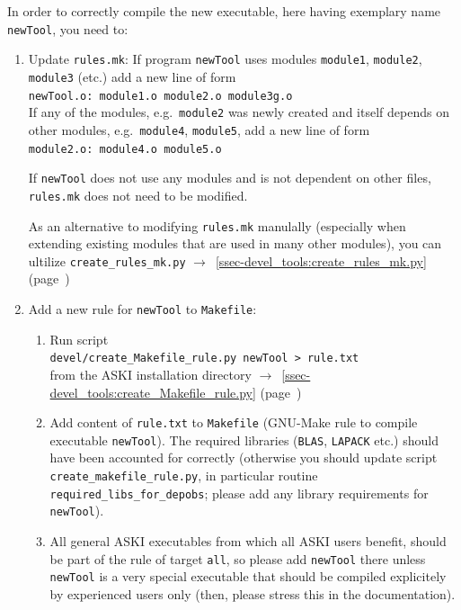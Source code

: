 \documentclass[12pt,a4paper]{article}
\newcommand{\lcode}[1]{\nolinkurl{#1}}
\newcommand{\ASKI}{ {\ttfamily ASKI} }
\newcommand{\myaref}[1]{$\rightarrow$~\ref{#1} (page~\pageref{#1})}
\begin{document}
In order to correctly compile the new executable, here having exemplary name \lcode{newTool}, you need to:
\begin{enumerate}
\item Update \lcode{rules.mk}:
  If program \lcode{newTool} uses modules \lcode{module1}, \lcode{module2}, \lcode{module3} (etc.)
  add a new line of form\\
  \lcode{newTool.o: module1.o module2.o module3g.o}\\
  If any of the modules, e.g.\ \lcode{module2} was newly created and
  itself depends on other modules, e.g.\ \lcode{module4}, \lcode{module5},
  add a new line of form\\
  \lcode{module2.o: module4.o module5.o}

  If \lcode{newTool} does not use any modules and is not dependent on other files, \lcode{rules.mk} does not need 
  to be modified. 

  As an alternative to modifying \lcode{rules.mk} manulally (especially when extending existing modules that are
  used in many other modules), you can ultilize \lcode{create_rules_mk.py}
  \myaref{ssec-devel_tools:create_rules_mk.py}

\item Add a new rule for \lcode{newTool} to \lcode{Makefile}: 
  \begin{enumerate}
  \item Run script\\
    \lcode{devel/create_Makefile_rule.py newTool > rule.txt}\\
    from the \ASKI{} installation directory \myaref{ssec-devel_tools:create_Makefile_rule.py}
  \item Add content of \lcode{rule.txt} to \lcode{Makefile} (GNU-Make rule to compile executable \lcode{newTool}).
    The required libraries (\lcode{BLAS}, \lcode{LAPACK} etc.) should have been accounted for correctly
    (otherwise you should update script \lcode{create_makefile_rule.py}, in particular routine 
    \lcode{required_libs_for_depobs}; please add any library requirements for \lcode{newTool}).
  \item All general \ASKI{} executables from which all \ASKI{} users benefit, should be part of the rule of
    target \lcode{all}, so please add \lcode{newTool} there unless \lcode{newTool} is a very special executable
    that should be compiled explicitely by experienced users only (then, please stress this in the documentation).
  \end{enumerate}
\end{enumerate}
\end{document}
